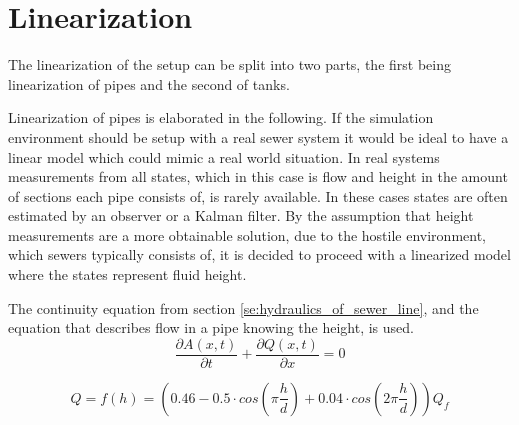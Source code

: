 \section{Linearization}\label{se:linearization}
The linearization of the setup can be split into two parts, the first being linearization of pipes and the second of tanks. 

Linearization of pipes is elaborated in the following.
If the simulation environment should be setup with a real sewer system it would be ideal to have a linear model which could mimic a real world situation.
In real systems measurements from all states, which in this case is flow and height in the amount of sections each pipe consists of, is rarely available.
In these cases states are often estimated by an observer or a Kalman filter. By the assumption that height measurements are a more obtainable solution, due to the hostile environment, which sewers typically consists of, it is decided to proceed with a linearized model where the states represent fluid height.

The continuity equation from section \ref{se:hydraulics_of_sewer_line}, and the equation that describes flow in a pipe knowing the height, is used. 
\begin{equation}\label{eq:linearization_Continuity}
\frac{\partial A(x,t)}{\partial t} + \frac{\partial Q(x,t)}{\partial x}=0
\end{equation}

\begin{equation}\label{eq:flow_eq_given_a_height}
	Q = f(h) = \left(0.46-0.5 \cdot cos\left(\pi \frac{h}{d}\right)+0.04\cdot cos\left(2\pi\frac{h}{d}\right)\right)Q_f
\end{equation}



